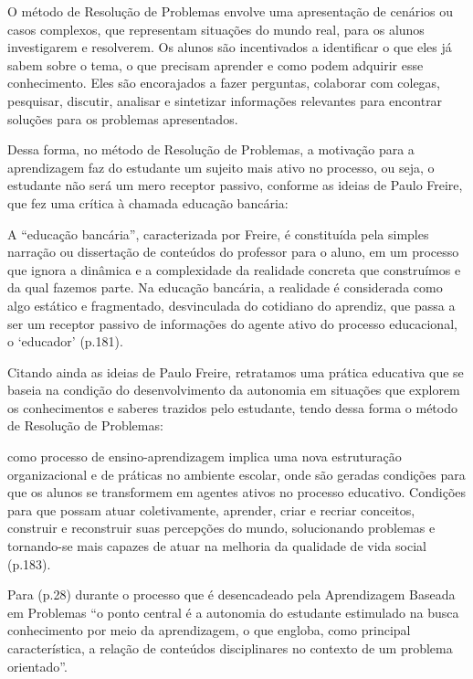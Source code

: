 O método de Resolução de Problemas envolve uma apresentação de cenários ou casos complexos, que representam situações do mundo real, para os alunos investigarem e resolverem. Os alunos são incentivados a identificar o que eles já sabem sobre o tema, o que precisam aprender e como podem adquirir esse conhecimento. Eles são encorajados a fazer perguntas, colaborar com colegas, pesquisar, discutir, analisar e sintetizar informações relevantes para encontrar soluções para os problemas apresentados.

Dessa forma, no método de Resolução de Problemas, a motivação para a aprendizagem faz do estudante um sujeito mais ativo no processo, ou seja, o estudante não será um mero receptor passivo, conforme as ideias de Paulo Freire, que fez uma crítica à chamada educação bancária:

\begin{citacao}
    A ``educação bancária'', caracterizada por Freire, é constituída pela simples narração ou dissertação de conteúdos do professor para o aluno, em um processo que ignora a dinâmica e a complexidade da realidade concreta que construímos e da qual fazemos parte. Na educação bancária, a realidade é considerada como algo estático e fragmentado, desvinculada do cotidiano do aprendiz, que passa a ser um receptor passivo de informações do agente ativo do processo educacional, o `educador' \cite{PIERINI2019} (p.181).
\end{citacao}

Citando ainda as ideias de Paulo Freire, retratamos uma prática educativa que se baseia na condição do desenvolvimento da autonomia em situações que explorem os conhecimentos e saberes trazidos pelo estudante, tendo dessa forma o método de Resolução de Problemas:

\begin{citacao}[portuguese]
    [...] como processo de ensino-aprendizagem implica uma nova estruturação organizacional e de práticas no ambiente escolar, onde são geradas condições para que os alunos se transformem em agentes ativos no processo educativo. Condições para que possam atuar coletivamente, aprender, criar e recriar conceitos, construir e reconstruir suas percepções do mundo, solucionando problemas e tornando-se mais capazes de atuar na melhoria da qualidade de vida social \cite{PIERINI2019} (p.183).
\end{citacao}

Para  (p.28) durante o processo que é desencadeado pela Aprendizagem Baseada em Problemas ``o ponto central é a autonomia do estudante estimulado na busca conhecimento por meio da aprendizagem, o que engloba, como principal característica, a relação de conteúdos disciplinares no contexto de um problema orientado''.

